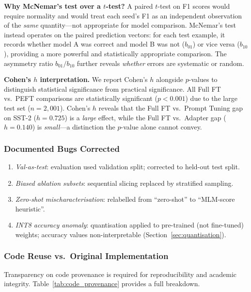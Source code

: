 \documentclass[conference]{IEEEtran}
\begin{document}
\textbf{Why McNemar's test over a $t$-test?} A paired $t$-test on F1 scores would require normality and would treat each seed's F1 as an independent observation of the \emph{same} quantity---not appropriate for model comparison. McNemar's test instead operates on the paired prediction vectors: for each test example, it records whether model A was correct and model B was not ($b_{01}$) or vice versa ($b_{10}$), providing a more powerful and statistically appropriate comparison. The asymmetry ratio $b_{01}/b_{10}$ further reveals \emph{whether} errors are systematic or random.

\textbf{Cohen's $h$ interpretation.} We report Cohen's $h$ alongside $p$-values to distinguish statistical significance from practical significance. All Full FT vs.\ PEFT comparisons are statistically significant ($p{<}0.001$) due to the large test set ($n{=}2{,}001$). Cohen's $h$ reveals that the Full FT vs.\ Prompt Tuning gap on SST-2 ($h{=}0.725$) is a \emph{large} effect, while the Full FT vs.\ Adapter gap ($h{=}0.140$) is \emph{small}---a distinction the $p$-value alone cannot convey.

\subsubsection{Documented Bugs Corrected}
\begin{enumerate}
  \item \textit{Val-as-test}: evaluation used validation split; corrected to held-out test split.
  \item \textit{Biased ablation subsets}: sequential slicing replaced by stratified sampling.
  \item \textit{Zero-shot mischaracterisation}: relabelled from ``zero-shot'' to ``MLM-score heuristic''.
  \item \textit{INT8 accuracy anomaly}: quantisation applied to pre-trained (not fine-tuned) weights; accuracy values non-interpretable (Section~\ref{sec:quantisation}).
\end{enumerate}

\subsubsection{Code Reuse vs.\ Original Implementation}

Transparency on code provenance is required for reproducibility and academic integrity. Table~\ref{tab:code_provenance} provides a full breakdown.
\end{document}
